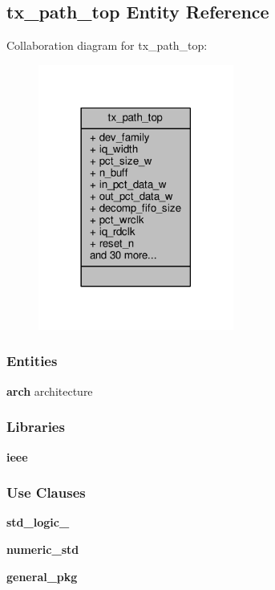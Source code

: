 \subsection{tx\+\_\+path\+\_\+top Entity Reference}
\label{classtx__path__top}


Collaboration diagram for tx\+\_\+path\+\_\+top\+:\nopagebreak
\begin{figure}[H]
\begin{center}
\leavevmode
\includegraphics[width=182pt]{d9/db0/classtx__path__top__coll__graph}
\end{center}
\end{figure}
\subsubsection*{Entities}
\begin{DoxyCompactItemize}
\item 
{\bf arch} architecture
\end{DoxyCompactItemize}
\subsubsection*{Libraries}
 \begin{DoxyCompactItemize}
\item 
{\bf ieee} 
\end{DoxyCompactItemize}
\subsubsection*{Use Clauses}
 \begin{DoxyCompactItemize}
\item 
{\bf std\+\_\+logic\+\_}   
\item 
{\bf numeric\+\_\+std}   
\item 
{\bf general\+\_\+pkg}   
\end{DoxyCompactItemize}
